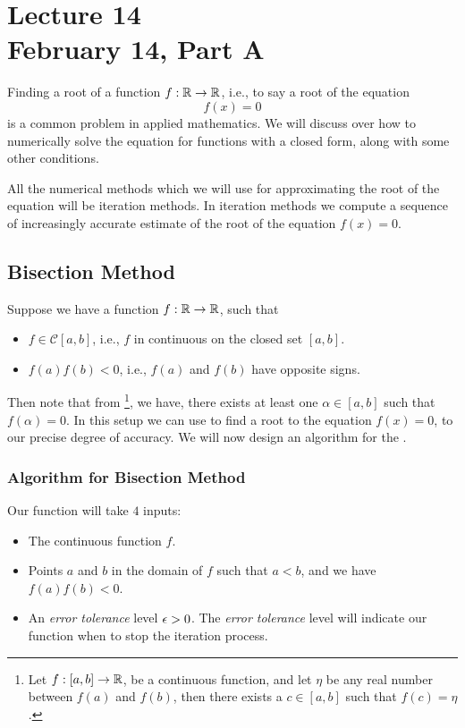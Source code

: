 \chapter*{Lecture 14 \\ February 14, Part A}
\setcounter{chapter}{14}
\setcounter{section}{0}

Finding a root of a function $f : \mathbb{R} \to \mathbb{R}$, i.e., to say a root of the equation 
\[
    f(x) = 0  
\]
is a common problem in applied mathematics. We will discuss over how to numerically solve the equation for functions with a closed form, along with some other conditions. 


All the numerical methods which we will use for approximating the root of the equation will be iteration methods. In iteration methods we compute a sequence of increasingly accurate estimate of the root of the equation $f(x) = 0$.

\section{Bisection Method}

Suppose we have a function $f : \mathbb{R} \to \mathbb{R}$, such that \begin{itemize}
    \item $f \in \mathcal{C}[a,b]$, i.e., $f$ in continuous on the closed set $[a,b]$. 
    \item $f(a)f(b) < 0$, i.e., $f(a)$ and $f(b)$ have opposite signs.  
\end{itemize}
Then note that from \footnote{ Let $f : [a,b] \to \mathbb{R}$, be a continuous function, and let $\eta$ be any real number between $f(a)$ and $f(b)$, then there exists a $c \in [a,b]$ such that $f(c) = \eta$.}, we have, there exists at least one $\alpha \in [a,b]$ such that $f(\alpha) = 0$. In this setup we can use  to find a root to the equation $f(x) = 0$, to our precise degree of accuracy. We will now design an algorithm for the .  

\subsection{Algorithm for Bisection Method}

Our function will take $4$ inputs: 
\begin{itemize}
    \item The continuous function $f$.
    \item Points $a$ and $b$ in the domain of $f$ such that $a < b$, and we have $f(a) f(b) < 0$.
    \item An \textit{error tolerance} level $\epsilon > 0$. The \textit{error tolerance} level will indicate our function when to stop the iteration process. 
\end{itemize}

